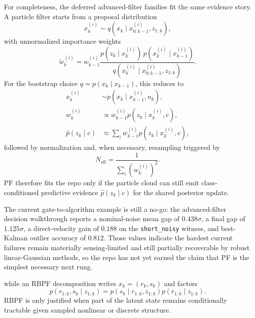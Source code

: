 \documentclass[11pt]{article}
\begin{document}
For completeness, the deferred advanced-filter families fit the same evidence story. A particle filter starts from a proposal distribution
\begin{equation}
x_k^{(i)} \sim q(x_k \mid x_{0:k-1}^{(i)}, z_{1:k}),
\end{equation}
with unnormalized importance weights
\begin{equation}
\tilde{w}_k^{(i)}
=
w_{k-1}^{(i)}
\frac{
    p(z_k \mid x_k^{(i)})\,p(x_k^{(i)} \mid x_{k-1}^{(i)})
}{
    q(x_k^{(i)} \mid x_{0:k-1}^{(i)}, z_{1:k})
}.
\end{equation}
For the bootstrap choice \(q = p(x_k \mid x_{k-1})\), this reduces to
\begin{align}
x_k^{(i)} &\sim p(x_k \mid x_{k-1}^{(i)}, u_k), \\
w_k^{(i)} &\propto w_{k-1}^{(i)} p(z_k \mid x_k^{(i)}, c), \\
\hat{p}(z_k \mid c) &\approx \sum_i w_{k-1}^{(i)} p(z_k \mid x_k^{(i)}, c),
\end{align}
followed by normalization and, when necessary, resampling triggered by
\begin{equation}
N_{\mathrm{eff}} = \frac{1}{\sum_i (w_k^{(i)})^2}.
\end{equation}
PF therefore fits the repo only if the particle cloud can still emit
class-conditioned predictive evidence \(\hat{p}(z_k \mid c)\) for the shared
posterior update.

The current gate-to-algorithm example is still a no-go: the advanced-filter
decision walkthrough reports a nominal-noise mean gap of \(0.438\sigma\), a
final gap of \(1.125\sigma\), a direct-velocity gain of \(0.188\) on the
\texttt{short\_noisy} witness, and best-Kalman outlier accuracy of \(0.812\).
Those values indicate the hardest current failures remain materially
sensing-limited and still partially recoverable by robust linear-Gaussian
methods, so the repo has not yet earned the claim that PF is the simplest
necessary next rung.

while an RBPF decomposition writes \(x_k = (r_k, s_k)\) and factors
\begin{equation}
p(r_{1:k}, s_k \mid z_{1:k})
=
p(s_k \mid r_{1:k}, z_{1:k}) p(r_{1:k} \mid z_{1:k}).
\end{equation}
RBPF is only justified when part of the latent state remains conditionally tractable given sampled nonlinear or discrete structure.
\end{document}
